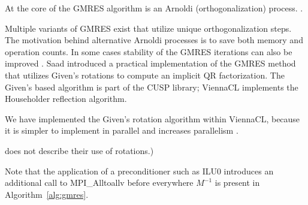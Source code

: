 At the core of the GMRES algorithm is an Arnoldi (orthogonalization) process. . 

Multiple variants of GMRES exist  that utilize unique orthogonalization steps. The motivation behind alternative Arnoldi processes is to save both memory and operation counts. In some cases stability of the GMRES iterations can also be improved . Saad \cite{Saad1986} introduced a practical implementation of the GMRES method that utilizes Given's rotations to compute an implicit QR factorization. The Given's based algorithm is part of the CUSP library; ViennaCL implements the Householder reflection algorithm. 

We have implemented the Given's rotation algorithm within ViennaCL, because it is simpler to implement in parallel and increases parallelism . 

\cite{Bahi2011} does not describe their use of rotations.) 

Note that the application of a preconditioner such as ILU0 introduces an additional call to MPI\_Alltoallv before everywhere $M^{-1}$ is present in Algorithm~\ref{alg:gmres}.

